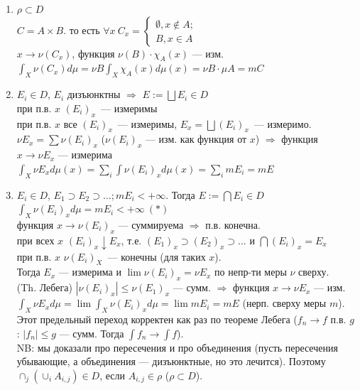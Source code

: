 \documentclass[paper=a4, fontsize=17pt]{article}
\begin{document}
		\begin{enumerate}
			\item
				$\rho \subset D$\\
				$C = A \times B$. то есть $\forall x\ C_x = 
                    \begin{cases}
                        \emptyset, x \not\in A;\\
                        B, x \in A
                    \end{cases}$\\
				$x \rightarrow \nu(C_x)$, функция $\nu(B) \cdot \chi_A(x)$ --- изм.\\
				$\int_X \nu(C_x)d\mu = \nu B \int_X \chi_A(x)d\mu(x) = \nu B \cdot \mu A = m C$
			\item
				$E_i \in D$, $E_i$ дизъюнктны $\Rightarrow$ $E := \bigsqcup E_i \in D$\\
				при п.в. $x$ $(E_i)_x$~--- измеримы\\
				при п.в. $x$ все $(E_i)_x$~--- измеримы, $E_x = \bigsqcup (E_i)_x$~--- измеримо.\\
				$\nu E_x = \sum \nu (E_i)_x$ ($\nu (E_i)_x$ --- изм. как функция от $x$) $\Rightarrow$ функция $ x \rightarrow \nu E_x$ --- измерима\\
				$\int_X \nu E_x d\mu(x) = \sum_{i}\int\nu(E_i)_x d\mu(x) = \sum_{i}m E_i = m E$
			\item
				$E_i \in D$, $E_1 \supset E_2 \supset \ldots ; m E_i < +\infty$. Тогда $E := \bigcap E_i \in D$\\
				$\int_X\nu(E_i)_x d\mu = m E_i < +\infty\ (*)$\\
				функция $x \rightarrow \nu(E_i)_x$ --- суммируема $\Rightarrow$ п.в. конечна.\\
				при всех $x$ $(E_i)_x \downarrow E_x$, т.е. $(E_1)_x \supset (E_2)_x \supset \ldots $ и $\bigcap(E_i)_x = E_x$\\
				при п.в. $x$ $\nu(E_i)_X$~--- конечны (для таких $x$).\\
				Тогда $E_x$ --- измерима и $\lim \nu(E_i)_x = \nu E_x$ по непр-ти меры $\nu$ сверху.\\
				(Th. Лебега) $|\nu(E_i)_x| \leq \nu(E_1)_x$ --- сумм. $\Rightarrow$ функция $x \rightarrow \nu E_x$ --- изм.\\
				$\int_X\nu E_x d\mu = \lim\int_X\nu(E_i)_x d\mu = \lim m E_i = m E$ (нерп. сверху меры $m$). Этот предельный переход корректен как раз по теореме Лебега ($f_n \rightarrow f$ п.в. $g$ : $|f_n| \leq g$ --- сумм. Тогда $\int f_n \rightarrow \int f$).\\
				NB: мы доказали про пересечения и про объединения (пусть пересечения убывающие, а объединения --- дизъюнктные, но это лечится). Поэтому $\cap_j(\cup_i A_{i, j}) \in D$, если $A_{i,j} \in \rho$ ($\rho \subset D$).
				

\end{enumerate}
\end{document}
